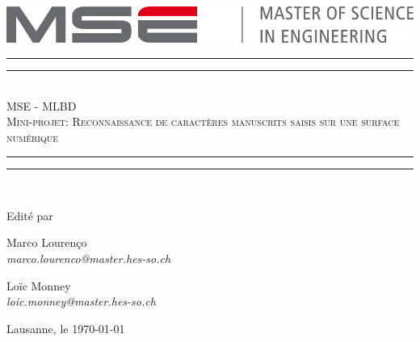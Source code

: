 \begingroup

\begin{center}
\vspace*{\baselineskip}
\vspace{1cm}
\centering
\includegraphics[width=\textwidth]{pictures/logo-mse.jpg}

\vspace{2cm}

\rule{\textwidth}{1.6pt}\vspace*{-\baselineskip}\vspace*{2pt} %
\rule{\textwidth}{0.4pt}\\[\baselineskip] %

{\LARGE \MakeUppercase{MSE - MLBD}}\\[0.2\baselineskip] %
\vspace{6pt}
{\LARGE \textsc{Mini-projet: Reconnaissance de caractères manuscrits saisis  sur une surface numérique}}\\[0.2\baselineskip] %

\rule{\textwidth}{0.4pt}\vspace*{-\baselineskip}\vspace{3.2pt} %
\rule{\textwidth}{1.6pt}\\[\baselineskip] %
\scshape

\vspace{0.5cm}

\par
\vspace{2cm}

Edité par

\vspace{0.5cm}
{\Large Marco Lourenço} \\
{\itshape marco.lourenco@master.hes-so.ch }

\vspace{0.5cm}
{\Large Loïc Monney } \\
{\itshape loic.monney@master.hes-so.ch }

\vspace{3cm}

\vspace*{2\baselineskip}



\vfill
Lausanne, le {\today}
\end{center}
\clearpage

\endgroup
